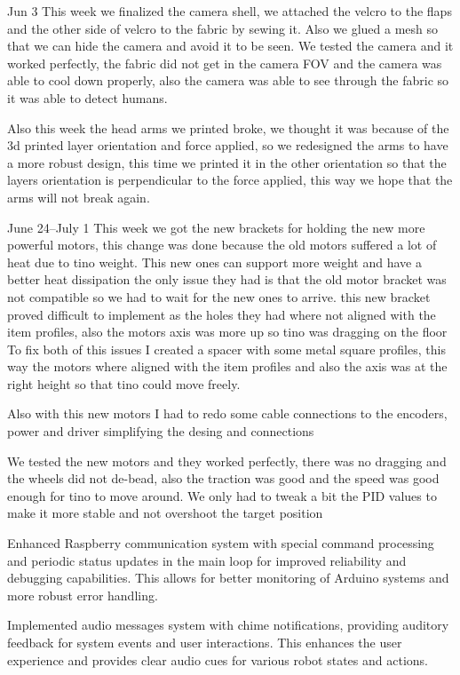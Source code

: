 Jun 3
This week we finalized the camera shell, we attached the velcro to the flaps and the other side of velcro to the fabric by sewing it. Also we glued a mesh so that we can hide the camera and avoid it to be seen.
We tested the camera and it worked perfectly, the fabric did not get in the camera FOV and the camera was able to cool down properly, also the camera was able to see through the fabric so it was able to detect humans.

Also this week the head arms we printed broke, we thought it was because of the 3d printed layer orientation and force applied, so we redesigned the arms to have a more robust design, this time we printed it in the other orientation so that the layers orientation is perpendicular to the force applied, this way we hope that the arms will not break again.

June 24--July 1
This week we got the new brackets for holding the new more powerful motors, this change was done because the old motors suffered a lot of heat due to tino weight. This new ones can support more weight and have a better heat dissipation
the only issue they had is that the old motor bracket was not compatible so we had to wait for the new ones to arrive. this new bracket proved difficult to implement as the holes they had where not aligned with the item profiles, also the motors axis was more up so tino was dragging on the floor
To fix both of this issues I created a spacer with some metal square profiles, this way the motors where aligned with the item profiles and also the axis was at the right height so that tino could move freely.

Also with this new motors I had to redo some cable connections to the encoders, power and driver simplifying the desing and connections

We tested the new motors and they worked perfectly, there was no dragging and the wheels did not de-bead, also the traction was good and the speed was good enough for tino to move around. We only had to tweak a bit the PID values to make it more stable and not overshoot the target position

Enhanced Raspberry communication system with special command processing and periodic status updates in the main loop for improved reliability and debugging capabilities. This allows for better monitoring of Arduino systems and more robust error handling.

Implemented audio messages system with chime notifications, providing auditory feedback for system events and user interactions. This enhances the user experience and provides clear audio cues for various robot states and actions.

